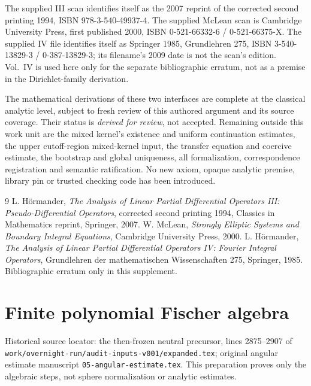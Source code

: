 \documentclass[11pt]{article}
\theoremstyle{definition}
\theoremstyle{remark}
\numberwithin{equation}{section}
\begin{document}
The supplied III scan identifies itself as the 2007 reprint of the
corrected second printing 1994, ISBN 978-3-540-49937-4. The supplied
McLean scan is Cambridge University Press, first published 2000,
ISBN 0-521-66332-6 / 0-521-66375-X. The supplied IV file identifies itself
as Springer 1985, Grundlehren 275, ISBN 3-540-13829-3 / 0-387-13829-3;
its filename's 2009 date is not the scan's edition. Vol.~IV is used here
only for the separate bibliographic erratum, not as a premise in the
Dirichlet-family derivation.

The mathematical derivations of these two interfaces are complete at
the classical analytic level, subject to fresh review of this authored
argument and its source coverage. Their status is \emph{derived for review},
not accepted. Remaining outside this work unit are the mixed kernel's
existence and uniform continuation estimates, the upper cutoff-region
mixed-kernel input, the transfer equation and coercive estimate, the
bootstrap and global uniqueness, all formalization, correspondence
registration and semantic ratification. No new axiom, opaque analytic
premise, library pin or trusted checking code has been introduced.

\begin{thebibliography}{9}
 L. H\"ormander, \emph{The Analysis of Linear Partial
Differential Operators III: Pseudo-Differential Operators}, corrected
second printing 1994, Classics in Mathematics reprint, Springer, 2007.
 W. McLean, \emph{Strongly Elliptic Systems and Boundary
Integral Equations}, Cambridge University Press, 2000.
 L. H\"ormander, \emph{The Analysis of Linear Partial
Differential Operators IV: Fourier Integral Operators}, Grundlehren der
mathematischen Wissenschaften 275, Springer, 1985. Bibliographic erratum
only in this supplement.
\end{thebibliography}

\clearpage

\section{Finite polynomial Fischer algebra}
\label{fischer:pairing}
Historical source locator: the then-frozen neutral precursor, lines 2875--2907 of
\nolinkurl{work/overnight-run/audit-inputs-v001/expanded.tex}; original angular
estimate manuscript \texttt{05-angular-estimate.tex}. This preparation proves
only the algebraic steps, not sphere normalization or analytic estimates.
\end{document}
